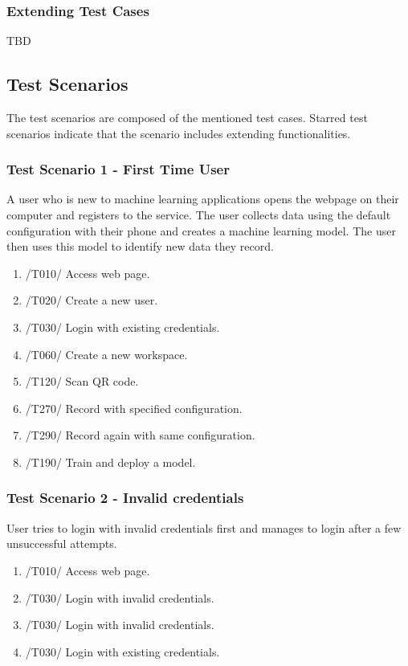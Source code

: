 \subsubsection{Extending Test Cases}
TBD
\subsection{Test Scenarios}
The test scenarios are composed of the mentioned test cases. Starred test scenarios indicate that the scenario includes extending functionalities.
\subsubsection{Test Scenario 1 - First Time User}
A user who is new to machine learning applications opens the webpage on their computer and registers to the service. The user collects data using the default configuration with their phone and creates a machine learning model. The user then uses this model to identify new data they record. 
\newpage
\begin{enumerate}
    \item /T010/ Access web page.
    \item /T020/ Create a new user.
    \item /T030/ Login with existing credentials.
    \item /T060/ Create a new workspace.
    \item /T120/ Scan QR code.
    \item /T270/ Record with specified configuration.
    \item /T290/ Record again with same configuration.
    \item /T190/ Train and deploy a model.
\end{enumerate}
\subsubsection{Test Scenario 2 - Invalid credentials}
User tries to login with invalid credentials first and manages to login after a few unsuccessful attempts.
\begin{enumerate}
    \item /T010/ Access web page.
    \item /T030/ Login with invalid credentials.
    \item /T030/ Login with invalid credentials.
    \item /T030/ Login with existing credentials.
\end{enumerate}
